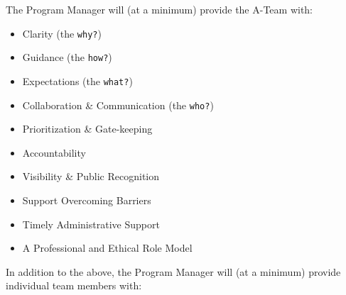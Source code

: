 \documentclass[
  letterpaper,
  DIV=11,
  numbers=noendperiod]{scrreprt}
\providecommand{\tightlist}{%
  \setlength{\itemsep}{0pt}\setlength{\parskip}{0pt}}\usepackage{longtable,booktabs,array}
\begin{document}
The Program Manager will (at a minimum) provide the A-Team with:

\begin{itemize}
\tightlist
\item
  Clarity (the \texttt{why?})\\
\item
  Guidance (the \texttt{how?})\\
\item
  Expectations (the \texttt{what?})\\
\item
  Collaboration \& Communication (the \texttt{who?})\\
\item
  Prioritization \& Gate-keeping\\
\item
  Accountability\\
\item
  Visibility \& Public Recognition\\
\item
  Support Overcoming Barriers\\
\item
  Timely Administrative Support\\
\item
  A Professional and Ethical Role Model
\end{itemize}

In addition to the above, the Program Manager will (at a minimum)
provide individual team members with:
\end{document}
